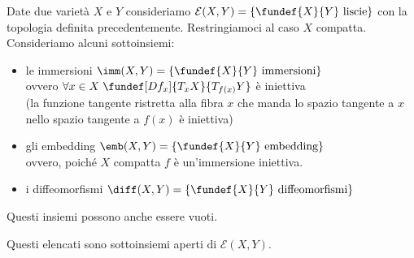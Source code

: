 


Date due varietà $X$ e $Y$ consideriamo $\mathcal E (X,Y)=\{ \fundef{X}{Y}\text{ liscie} \} $ con la topologia definita precedentemente. Restringiamoci al caso $X$ compatta. Consideriamo alcuni sottoinsiemi:
\begin{itemize}
\item le immersioni $\imm(X,Y) =\{\fundef{X}{Y}\text{ immersioni}\}$\\ovvero $\forall x \in X \; \fundef[Df_x]{T_xX}{T_{f(x)}Y}$ è iniettiva \\(la funzione tangente ristretta alla fibra $x$ che manda lo spazio tangente a $x$ nello spazio tangente a $f(x)$ è iniettiva)
\item gli embedding $\emb(X,Y)=\{\fundef{X}{Y}\text{ embedding}\}$\\ovvero, poiché $X$ compatta $f$ è un'immersione iniettiva.
\item i diffeomorfismi $\diff(X,Y)=\{\fundef{X}{Y}\text{ diffeomorfismi}\}$
\end{itemize}

\begin{oss}
Questi insiemi possono anche essere vuoti.
\end{oss}

\begin{teo}
Questi elencati sono sottoinsiemi aperti di $\mathcal E (X,Y)$.
\end{teo}

